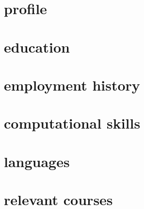 \documentclass{prometheus_cv}
\begin{document}
\thispagestyle{empty}
\pagestyle{fancy}

\vspace*{-1cm}
\centering 


\vspace*{0.4cm}

\section{profile}


\section{education}


\section{employment history}


\section{computational skills}


\section{languages}


\section{relevant courses}

\end{document}
